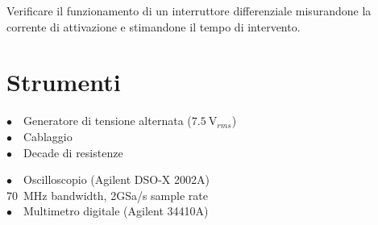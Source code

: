 Verificare il funzionamento di un interruttore differenziale misurandone la corrente di attivazione e stimandone il tempo di intervento.

\section{Strumenti}
%
\phantom{porcodio!}
\noindent
\begin{minipage}{.5\linewidth}
$\bullet \quad$Generatore di tensione alternata ($\SI{7.5}{\volt}_{rms}$)\\
$\bullet \quad$Cablaggio\\
$\bullet \quad$Decade di resistenze\\
\end{minipage}%
\begin{minipage}{.5\linewidth}
$\bullet \quad$Oscilloscopio (Agilent DSO-X 2002A)\\
\phantom{xxxx}\SI{70}{\mega\hertz} bandwidth, 2GSa/s sample rate\\
$\bullet \quad$Multimetro digitale (Agilent 34410A)\\
\end{minipage}